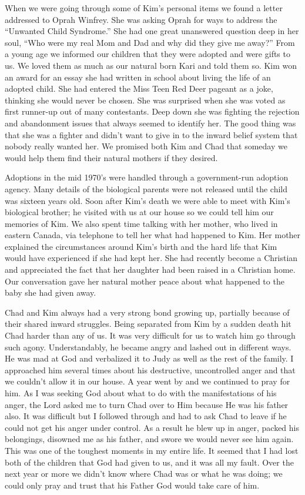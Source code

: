 \documentclass[twoside, 12pt]{book}
\begin{document}
When we were going through some of Kim's personal items we found a letter addressed to Oprah Winfrey. She was asking Oprah for ways to address the “Unwanted Child Syndrome.” She had one great unanswered question deep in her soul, “Who were my real Mom and Dad and why did they give me away?” From a young age we informed our children that they were adopted and were gifts to us. We loved them as much as our natural born Kari and told them so. Kim won an award for an essay she had written in school about living the life of an adopted child. She had entered the Miss Teen Red Deer pageant as a joke, thinking she would never be chosen. She was surprised when she was voted as first runner-up out of many contestants. Deep down she was fighting the rejection and abandonment issues that always seemed to identify her. The good thing was that she was a fighter and didn't want to give in to the inward belief system that nobody really wanted her. We promised both Kim and Chad that someday we would help them find their natural mothers if they desired. 

Adoptions in the mid 1970’s were handled through a government-run adoption agency. Many details of the biological parents were not released until the child was sixteen years old. Soon after Kim’s death we were able to meet with Kim's biological brother; he visited with us at our house so we could tell him our memories of Kim. We also spent time talking with her mother, who lived in eastern Canada, via telephone to tell her what had happened to Kim. Her mother explained the circumstances around Kim’s birth and the hard life that Kim would have experienced if she had kept her. She had recently become a Christian and appreciated the fact that her daughter had been raised in a Christian home. Our conversation gave her natural mother peace about what happened to the baby she had given away.

Chad and Kim always had a very strong bond growing up, partially because of their shared inward struggles. Being separated from Kim by a sudden death hit Chad harder than any of us. It was very difficult for us to watch him go through such agony. Understandably, he became angry and lashed out in different ways. He was mad at God and verbalized it to Judy as well as the rest of the family. I approached him several times about his destructive, uncontrolled anger and that we couldn’t allow it in our house.  A year went by and we continued to pray for him. As I was seeking God about what to do with the manifestations of his anger, the Lord asked me to turn Chad over to Him because He was his father also. It was difficult but I followed through and had to ask Chad to leave if he could not get his anger under control. As a result he blew up in anger, packed his belongings, disowned me as his father, and swore we would never see him again. This was one of the toughest moments in my entire life. It seemed that I had lost both of the children that God had given to us, and it was all my fault.  Over the next year or more we didn't know where Chad was or what he was doing; we could only pray and trust that his Father God would take care of him.
\end{document}
